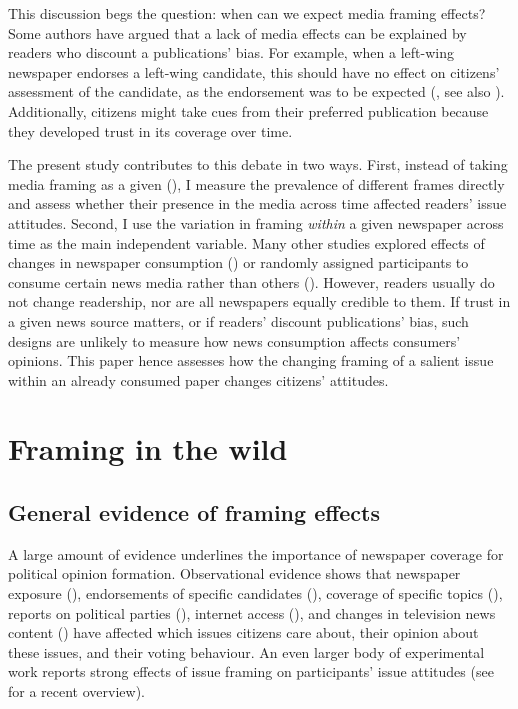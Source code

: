 \documentclass{article}
\begin{document}
This discussion begs the question: when can we expect media framing effects? Some authors have argued that a lack of media effects can be explained by readers who discount a publications' bias. For example, when a left-wing newspaper endorses a left-wing candidate, this should have no effect on citizens' assessment of the candidate, as the endorsement was to be expected (\cite{Chiang2011a}, see also \cite{Spirig2020}). Additionally, citizens might take cues from their preferred publication because they developed trust in its coverage over time.

The present study contributes to this debate in two ways. First, instead of taking media framing as a given (\cite{Foos2020, Guess2021}), I measure the prevalence of different frames directly and assess whether their presence in the media across time affected readers' issue attitudes. Second, I use the variation in framing \textit{within} a given newspaper across time as the main independent variable. Many other studies explored effects of changes in newspaper consumption (\cite{Foos2020, Gentzkow2011}) or randomly assigned participants to consume certain news media rather than others (\cite{Guess2021}). However, readers usually do not change readership, nor are all newspapers equally credible to them. If trust in a given news source matters, or if readers' discount publications' bias, such designs are unlikely to measure how news consumption affects consumers' opinions. This paper hence assesses how the changing framing of a salient issue within an already consumed paper changes citizens' attitudes. 

\section{Framing in the wild}

\subsection{General evidence of framing effects}

A large amount of evidence underlines the importance of newspaper coverage for political opinion formation. Observational evidence shows that newspaper exposure (\cite{Foos2020, Spirig2020}), endorsements of specific candidates (\cite{Ladd2009a, Chiang2011a}), coverage of specific topics (\cite{King2017}), reports on political parties (\cite{Boomgaarden2009, Devine2020}), internet access (\cite{Schaub2020}), and changes in television news content (\cite{Durante2012}) have affected which issues citizens care about, their opinion about these issues, and their voting behaviour. An even larger body of experimental work reports strong effects of issue framing on participants' issue attitudes (see \cite{Busby2019} for a recent overview).
\end{document}
